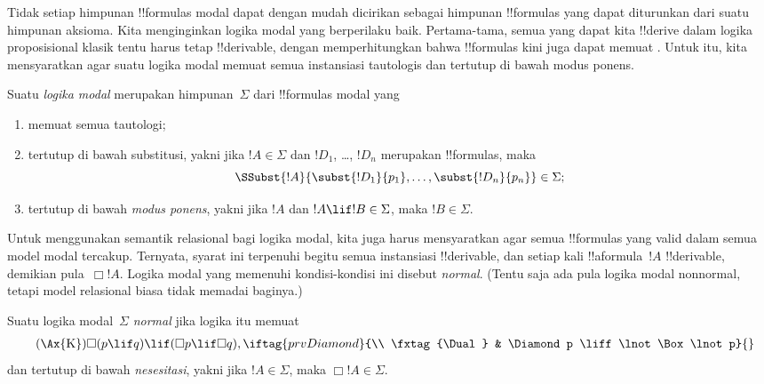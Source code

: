 \documentclass[../../../include/open-logic-section]{subfiles}
\begin{document}


Tidak setiap himpunan !!{formula}s modal dapat dengan mudah dicirikan sebagai
himpunan !!{formula}s yang dapat diturunkan dari suatu himpunan aksioma. Kita
menginginkan logika modal yang berperilaku baik. Pertama-tama, semua yang dapat
kita !!{derive} dalam logika proposisional klasik tentu harus tetap
!!{derivable}, dengan memperhitungkan bahwa !!{formula}s kini juga dapat
memuat 
. Untuk itu, kita mensyaratkan agar suatu
logika modal memuat semua instansiasi tautologis dan tertutup di bawah modus
ponens.

\begin{defn}
  Suatu \emph{logika modal} merupakan himpunan~$\Sigma$ dari !!{formula}s
  modal yang
  \begin{enumerate}
  \item memuat semua tautologi;
  \item tertutup di bawah substitusi, yakni jika $!A\in\Sigma$ dan
    $!D_1$, \dots, $!D_n$ merupakan !!{formula}s, maka
    \[
    \SSubst{!A}{\subst{!D_1}{p_1}, \dots, \subst{!D_n}{p_n}}\in\Sigma;
    \]
  \item tertutup di bawah \emph{modus ponens}, yakni jika $!A$ dan
    $!A\lif !B\in\Sigma$, maka $!B\in\Sigma$.
  \end{enumerate}
\end{defn}

Untuk menggunakan semantik relasional bagi logika modal, kita juga harus
mensyaratkan agar semua !!{formula}s yang valid dalam semua model modal
tercakup. Ternyata, syarat ini terpenuhi begitu semua instansiasi
 !!{derivable}, dan setiap kali
!!a{formula}~$!A$ !!{derivable}, demikian pula~$\Box !A$. Logika modal
yang memenuhi kondisi-kondisi ini disebut \emph{normal}. (Tentu saja ada pula
logika modal nonnormal, tetapi model relasional biasa tidak memadai baginya.)

\begin{defn}
  Suatu logika modal~$\Sigma$ \emph{normal} jika logika itu memuat
  \begin{align*}
    \tag{\Ax{K}} & \Box(p \lif q) \lif (\Box p \lif \Box q),
    \iftag{prvDiamond}{\\
      \tag{\Dual} & \Diamond p \liff \lnot\Box\lnot p}{}
  \end{align*}
  dan tertutup di bawah \emph{nesesitasi}, yakni jika $!A\in\Sigma$, maka
  $\Box !A\in\Sigma$.
\end{defn}
\end{document}

